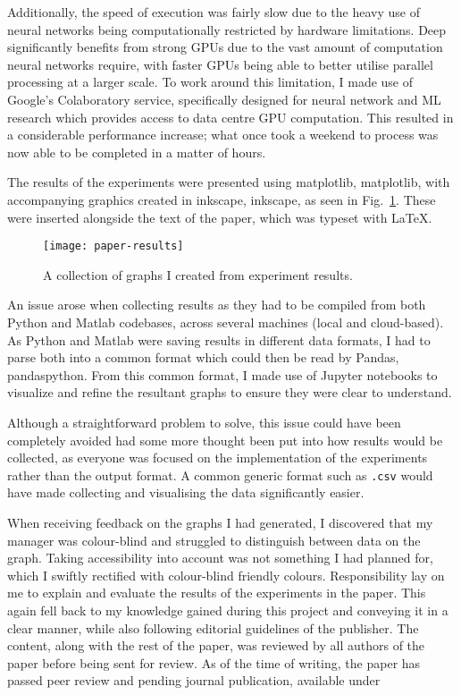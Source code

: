 Additionally, the speed of execution was fairly slow due to the heavy use of neural networks being
computationally restricted by hardware limitations. Deep  significantly benefits from
strong GPUs due to the vast amount of computation neural networks require, with faster GPUs being
able to better utilise parallel processing at a larger scale. To work around this limitation, I made
use of Google's Colaboratory service, specifically designed for neural network and ML research which
provides access to data centre GPU computation. This resulted in a considerable performance
increase; what once took a weekend to process was now able to be completed in a matter of hours.

The results of the experiments were presented using \gls*{matplotlib}, \glsdesc*{matplotlib}, with
accompanying graphics created in \gls*{inkscape}, \glsdesc*{inkscape}, as seen in
Fig.~\ref{fig:paper-figures}. These were inserted alongside the text of the paper, which was typeset
with \LaTeX.

\begin{figure}
    \centering
    \texttt{[image: paper-results]}
    \caption{A collection of graphs I created from experiment results.\label{fig:paper-figures}}
\end{figure}

An issue arose when collecting results as they had to be compiled from both Python and Matlab
codebases, across several machines (local and cloud-based). As Python and Matlab were saving results
in different data formats, I had to parse both into a common format which could then be read by
Pandas, \glsdesc*{pandaspython}. From this common format, I made use of Jupyter notebooks to
visualize and refine the resultant graphs to ensure they were clear to understand.

Although a straightforward problem to solve, this issue could have been completely avoided had some
more thought been put into how results would be collected, as everyone was focused on the
implementation of the experiments rather than the output format. A common generic format such as
\texttt{.csv} would have made collecting and visualising the data significantly easier.

When receiving feedback on the graphs I had generated, I discovered that my manager was colour-blind
and struggled to distinguish between data on the graph. Taking accessibility into account was not
something I had planned for, which I swiftly rectified with colour-blind friendly colours.
Responsibility lay on me to explain and evaluate the results of the experiments in the paper. This
again fell back to my knowledge gained during this project and conveying it in a clear manner, while
also following editorial guidelines of the publisher. The content, along with the rest of the paper,
was reviewed by all authors of the paper before being sent for review. As of the time of writing,
the paper has passed peer review and pending journal publication, available under
\textcite{alhousani2023geometric}

